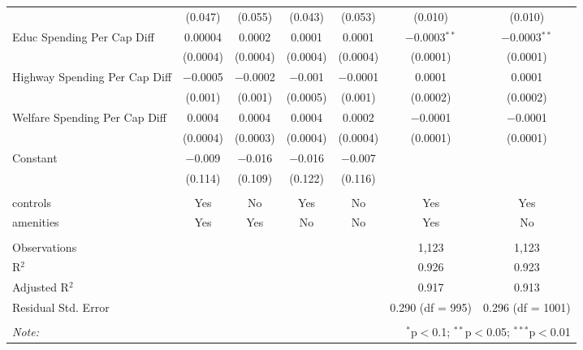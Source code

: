 \begin{table}[!htbp]
\begin{tabular}{@{\extracolsep{5pt}}lcccccc}
  & (0.047) & (0.055) & (0.043) & (0.053) & (0.010) & (0.010) \\ 
  Educ Spending Per Cap Diff & 0.00004 & 0.0002 & 0.0001 & 0.0001 & $-$0.0003$^{**}$ & $-$0.0003$^{**}$ \\ 
  & (0.0004) & (0.0004) & (0.0004) & (0.0004) & (0.0001) & (0.0001) \\ 
  Highway Spending Per Cap Diff & $-$0.0005 & $-$0.0002 & $-$0.001 & $-$0.0001 & 0.0001 & 0.0001 \\ 
  & (0.001) & (0.001) & (0.0005) & (0.001) & (0.0002) & (0.0002) \\ 
  Welfare Spending Per Cap Diff & 0.0004 & 0.0004 & 0.0004 & 0.0002 & $-$0.0001 & $-$0.0001 \\ 
  & (0.0004) & (0.0003) & (0.0004) & (0.0004) & (0.0001) & (0.0001) \\ 
  Constant & $-$0.009 & $-$0.016 & $-$0.016 & $-$0.007 &  &  \\ 
  & (0.114) & (0.109) & (0.122) & (0.116) &  &  \\ 
 \hline \\[-1.8ex] 
controls & Yes & No & Yes & No & Yes & Yes \\ 
amenities & Yes & Yes & No & No & Yes & No \\ 
\hline \\[-1.8ex] 
Observations &  &  &  &  & 1,123 & 1,123 \\ 
R$^{2}$ &  &  &  &  & 0.926 & 0.923 \\ 
Adjusted R$^{2}$ &  &  &  &  & 0.917 & 0.913 \\ 
Residual Std. Error &  &  &  &  & 0.290 (df = 995) & 0.296 (df = 1001) \\ 
\hline 
\hline \\[-1.8ex] 
\textit{Note:}  & \multicolumn{6}{r}{$^{*}$p$<$0.1; $^{**}$p$<$0.05; $^{***}$p$<$0.01} \\ 
\end{tabular} 
\end{table} 
